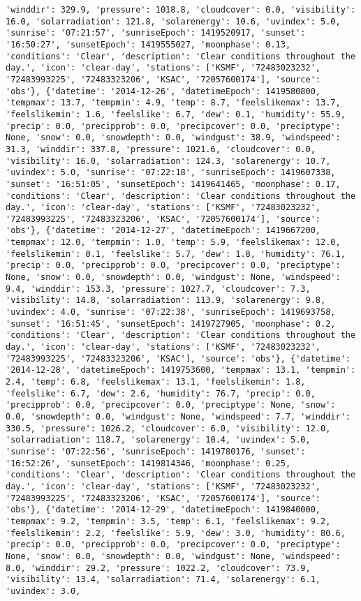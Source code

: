 \documentclass[
  letterpaper,
  DIV=11,
  numbers=noendperiod]{scrartcl}
\begin{document}
\begin{verbatim}
'winddir': 329.9, 'pressure': 1018.8, 'cloudcover': 0.0, 'visibility': 16.0, 'solarradiation': 121.8, 'solarenergy': 10.6, 'uvindex': 5.0, 'sunrise': '07:21:57', 'sunriseEpoch': 1419520917, 'sunset': '16:50:27', 'sunsetEpoch': 1419555027, 'moonphase': 0.13, 'conditions': 'Clear', 'description': 'Clear conditions throughout the day.', 'icon': 'clear-day', 'stations': ['KSMF', '72483023232', '72483993225', '72483323206', 'KSAC', '72057600174'], 'source': 'obs'}, {'datetime': '2014-12-26', 'datetimeEpoch': 1419580800, 'tempmax': 13.7, 'tempmin': 4.9, 'temp': 8.7, 'feelslikemax': 13.7, 'feelslikemin': 1.6, 'feelslike': 6.7, 'dew': 0.1, 'humidity': 55.9, 'precip': 0.0, 'precipprob': 0.0, 'precipcover': 0.0, 'preciptype': None, 'snow': 0.0, 'snowdepth': 0.0, 'windgust': 38.9, 'windspeed': 31.3, 'winddir': 337.8, 'pressure': 1021.6, 'cloudcover': 0.0, 'visibility': 16.0, 'solarradiation': 124.3, 'solarenergy': 10.7, 'uvindex': 5.0, 'sunrise': '07:22:18', 'sunriseEpoch': 1419607338, 'sunset': '16:51:05', 'sunsetEpoch': 1419641465, 'moonphase': 0.17, 'conditions': 'Clear', 'description': 'Clear conditions throughout the day.', 'icon': 'clear-day', 'stations': ['KSMF', '72483023232', '72483993225', '72483323206', 'KSAC', '72057600174'], 'source': 'obs'}, {'datetime': '2014-12-27', 'datetimeEpoch': 1419667200, 'tempmax': 12.0, 'tempmin': 1.0, 'temp': 5.9, 'feelslikemax': 12.0, 'feelslikemin': 0.1, 'feelslike': 5.7, 'dew': 1.8, 'humidity': 76.1, 'precip': 0.0, 'precipprob': 0.0, 'precipcover': 0.0, 'preciptype': None, 'snow': 0.0, 'snowdepth': 0.0, 'windgust': None, 'windspeed': 9.4, 'winddir': 153.3, 'pressure': 1027.7, 'cloudcover': 7.3, 'visibility': 14.8, 'solarradiation': 113.9, 'solarenergy': 9.8, 'uvindex': 4.0, 'sunrise': '07:22:38', 'sunriseEpoch': 1419693758, 'sunset': '16:51:45', 'sunsetEpoch': 1419727905, 'moonphase': 0.2, 'conditions': 'Clear', 'description': 'Clear conditions throughout the day.', 'icon': 'clear-day', 'stations': ['KSMF', '72483023232', '72483993225', '72483323206', 'KSAC'], 'source': 'obs'}, {'datetime': '2014-12-28', 'datetimeEpoch': 1419753600, 'tempmax': 13.1, 'tempmin': 2.4, 'temp': 6.8, 'feelslikemax': 13.1, 'feelslikemin': 1.8, 'feelslike': 6.7, 'dew': 2.6, 'humidity': 76.7, 'precip': 0.0, 'precipprob': 0.0, 'precipcover': 0.0, 'preciptype': None, 'snow': 0.0, 'snowdepth': 0.0, 'windgust': None, 'windspeed': 7.7, 'winddir': 330.5, 'pressure': 1026.2, 'cloudcover': 6.0, 'visibility': 12.0, 'solarradiation': 118.7, 'solarenergy': 10.4, 'uvindex': 5.0, 'sunrise': '07:22:56', 'sunriseEpoch': 1419780176, 'sunset': '16:52:26', 'sunsetEpoch': 1419814346, 'moonphase': 0.25, 'conditions': 'Clear', 'description': 'Clear conditions throughout the day.', 'icon': 'clear-day', 'stations': ['KSMF', '72483023232', '72483993225', '72483323206', 'KSAC', '72057600174'], 'source': 'obs'}, {'datetime': '2014-12-29', 'datetimeEpoch': 1419840000, 'tempmax': 9.2, 'tempmin': 3.5, 'temp': 6.1, 'feelslikemax': 9.2, 'feelslikemin': 2.2, 'feelslike': 5.9, 'dew': 3.0, 'humidity': 80.6, 'precip': 0.0, 'precipprob': 0.0, 'precipcover': 0.0, 'preciptype': None, 'snow': 0.0, 'snowdepth': 0.0, 'windgust': None, 'windspeed': 8.0, 'winddir': 29.2, 'pressure': 1022.2, 'cloudcover': 73.9, 'visibility': 13.4, 'solarradiation': 71.4, 'solarenergy': 6.1, 'uvindex': 3.0, 
\end{verbatim}
\end{document}
